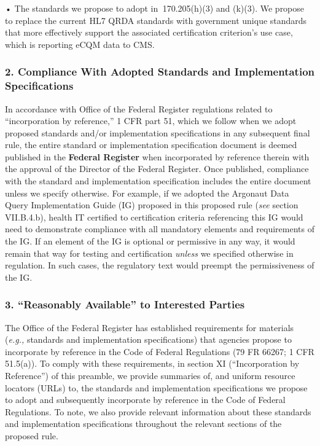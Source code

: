 \documentclass[twoside,11pt]{article}
\begin{document}
            • The standards we propose to adopt in \textsection{} 170.205(h)(3) and (k)(3). We propose to replace the current HL7 QRDA standards with government unique standards that more effectively support the associated certification criterion's use case, which is reporting eCQM data to CMS.


          
          \subsubsection{2. Compliance With Adopted Standards and Implementation Specifications}


          In accordance with Office of the Federal Register regulations related to “incorporation by reference,” 1 CFR part 51, which we follow when we adopt proposed standards and/or implementation specifications in any subsequent final rule, the entire standard or implementation specification document is deemed published in the \textbf{Federal Register} when incorporated by reference therein with the approval of the Director of the Federal Register. Once published, compliance with the standard and implementation specification includes the entire document unless we specify otherwise. For example, if we adopted the Argonaut Data Query Implementation Guide (IG) proposed in this proposed rule (\emph{see} section VII.B.4.b), health IT certified to certification criteria referencing this IG would need to demonstrate compliance with all mandatory elements and requirements of the IG. If an element of the IG is optional or permissive in any way, it would remain that way for testing and certification \emph{unless} we specified otherwise in regulation. In such cases, the regulatory text would preempt the permissiveness of the IG.


          \subsubsection{3. “Reasonably Available” to Interested Parties}


          The Office of the Federal Register has established requirements for materials (\emph{e.g.,} standards and implementation specifications) that agencies propose to incorporate by reference in the Code of Federal Regulations (79 FR 66267; 1 CFR 51.5(a)). To comply with these requirements, in section XI (“Incorporation by Reference”) of this preamble, we provide summaries of, and uniform resource locators (URLs) to, the standards and implementation specifications we propose to adopt and subsequently incorporate by reference in the Code of Federal Regulations. To note, we also provide relevant information about these standards and implementation specifications throughout the relevant sections of the proposed rule.
\end{document}
